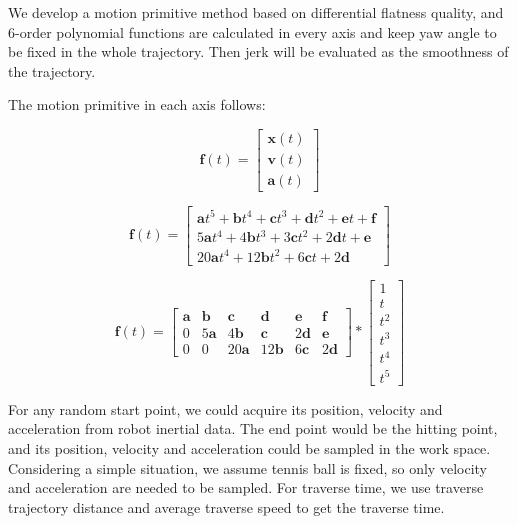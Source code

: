 \documentclass{jarticle}
\begin{document}
We develop a motion primitive method based on differential flatness quality, and 6-order polynomial functions are calculated in every axis and keep yaw angle to be fixed in the whole trajectory. Then jerk will be evaluated as the smoothness of the trajectory\cite{eth-juggling}.

The motion primitive in each axis follows:

\begin{equation}
  \label{eq:temp}
  \bm{f}(t) = \left[ \begin{array}{c}
      \bm{x}(t) \\
      \bm{v}(t) \\
      \bm{a}(t)
    \end{array}\right]
\end{equation}

\begin{equation}
  \label{eq:temp2-0}
  \bm{f}(t) = \left[ \begin{array}{c}
      \bm{a}t^5 + \bm{b}t^4 + \bm{c}t^3 + \bm{d}t^2 + \bm{e}t + \bm{f} \\
      5\bm{a}t^4 + 4\bm{b}t^3 + 3\bm{c}t^2 + 2\bm{d}t + \bm{e} \\
      20\bm{a}t^4 + 12\bm{b}t^2 + 6\bm{c}t + 2\bm{d}
  \end{array}\right]
\end{equation}

\begin{equation}
  \label{eq:temp2}
  \bm{f}(t) = \begin{bmatrix}
      \bm{a} & \bm{b} & \bm{c} & \bm{d} & \bm{e} & \bm{f} \\
      0 & 5\bm{a} & 4\bm{b} & \bm{c} & 2\bm{d} & \bm{e} \\
      0 & 0 & 20\bm{a} & 12\bm{b} & 6\bm{c} & 2\bm{d}
  \end{bmatrix}
  *
  \left[ \begin{array}{c}
      1 \\
      t \\
      t^2 \\
      t^3 \\
      t^4 \\
      t^5
    \end{array}\right]
\end{equation}


For any random start point, we could acquire its position, velocity and acceleration from robot inertial data. The end point would be the hitting point, and its position, velocity and acceleration could be sampled in the work space. Considering a simple situation, we assume tennis ball is fixed, so only velocity and acceleration are needed to be sampled. For traverse time, we use traverse trajectory distance and average traverse speed to get the traverse time.
\end{document}
